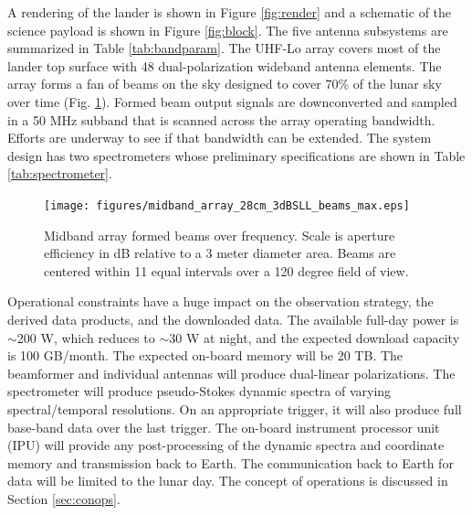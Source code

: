A rendering of the lander is shown in Figure \ref{fig:render} and a schematic of the science payload is shown in Figure \ref{fig:block}.
The five antenna subsystems are summarized in Table \ref{tab:bandparam}.  The UHF-Lo array covers most of the lander top surface with 48 dual-polarization wideband antenna elements. The array forms a fan of beams on the sky designed to cover 70\% of the lunar sky over time (Fig. \ref{fig:midband_beam_maps}). Formed beam output signals are downconverted and sampled in a 50 MHz subband that is scanned across the array operating bandwidth.  Efforts are underway to see if that bandwidth can be extended. The system design has two spectrometers whose preliminary specifications are shown in Table \ref{tab:spectrometer}. 




\begin{figure}
	\centering
	\texttt{[image: figures/midband\_array\_28cm\_3dBSLL\_beams\_max.eps]}
	\caption{Midband array formed beams over frequency. Scale is aperture efficiency in dB relative to a 3 meter diameter area. Beams are centered within 11 equal intervals over a 120 degree field of view.}
	\label{fig:midband_beam_maps}
\end{figure}

Operational constraints have a huge impact on the observation strategy, the derived data products, and the downloaded data.  The available full-day power is $\sim$200 W, which reduces to $\sim$30 W at night, and the expected download capacity is 100 GB/month.  The expected on-board memory will be 20 TB.  The beamformer and individual antennas will produce dual-linear polarizations.  The spectrometer will produce pseudo-Stokes dynamic spectra of varying spectral/temporal resolutions. On an appropriate trigger, it will also produce full base-band data over the last trigger. 
The on-board instrument processor unit (IPU) will provide any post-processing of the dynamic spectra and coordinate memory and transmission back to Earth.  The communication back to Earth for data will be limited to the lunar day.  The concept of operations is discussed in Section \ref{sec:conops}.

